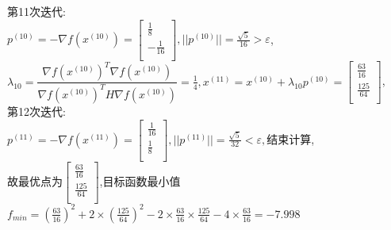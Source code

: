 \begin{solution}
    第11次迭代:\\
    $p^{(10)}=-\nabla f(x^{(10)})=\begin{bmatrix} \frac{1}{8}\\-\frac{1}{16}\\\end{bmatrix},||p^{(10)}||=\frac{\sqrt{5}}{16}>\varepsilon$,\\
    $\lambda_{10}=\dfrac{\nabla f(x^{(10)})^T\nabla f(x^{(10)})}{\nabla f(x^{(10)})^TH\nabla f(x^{(10)})}=\frac{1}{4},x^{(11)}=x^{(10)}+\lambda_{10}p^{(10)}=\begin{bmatrix} \frac{63}{16}\\\frac{125}{64}\\\end{bmatrix}$,\\
    第12次迭代:\\
    $p^{(11)}=-\nabla f(x^{(11)})=\begin{bmatrix} \frac{1}{16}\\\frac{1}{8}\\\end{bmatrix},||p^{(11)}||=\frac{\sqrt{5}}{32}<\varepsilon,\text{结束计算}$,\\
    故最优点为$\begin{bmatrix} \frac{63}{16}\\\frac{125}{64}\\\end{bmatrix}$,目标函数最小值$f_{min}=(\frac{63}{16})^2+2\times(\frac{125}{64})^2-2\times\frac{63}{16}\times\frac{125}{64}-4\times\frac{63}{16}=-7.998$
\end{solution}

